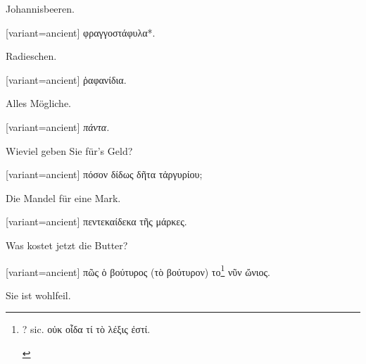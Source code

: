 Johannis\textcompwordmark{}beeren. 

\egroup\switchcolumn\bgroup

\begin{greek}[variant=ancient]%
φραγγοστάφυλα{*}.

\end{greek}%
\egroup\switchcolumn*\bgroup

Radies\textcompwordmark{}chen. 

\egroup\switchcolumn\bgroup

\begin{greek}[variant=ancient]%
ῥαφανίδια.

\end{greek}%
\egroup\switchcolumn*\bgroup

Alles Mögliche. 

\egroup\switchcolumn

\begin{greek}[variant=ancient]%
\emph{πάντα.}

\end{greek}%
\switchcolumn*

Wieviel geben Sie für's Geld? 

\switchcolumn

\begin{greek}[variant=ancient]%
πόσον δίδως δῆτα τἀργυρίου;

\end{greek}%
\switchcolumn*

Die Mandel für eine Mark. 

\switchcolumn

\begin{greek}[variant=ancient]%
πεντεκαίδεκα τῆς μάρκες.

\end{greek}%
\switchcolumn*

Was kostet jetzt die Butter? 

\switchcolumn

\begin{greek}[variant=ancient]%
πῶς ὁ βούτυρος (τὸ βούτυρον) το\footnote{\begin{latin}%
? sic. \textgreek[variant=ancient]{οὐκ οἶδα τί τὸ λέξις ἐστί.}\end{latin}%
} νῦν ὤνιος.

\end{greek}%
\switchcolumn*

Sie ist wohlfeil. 

